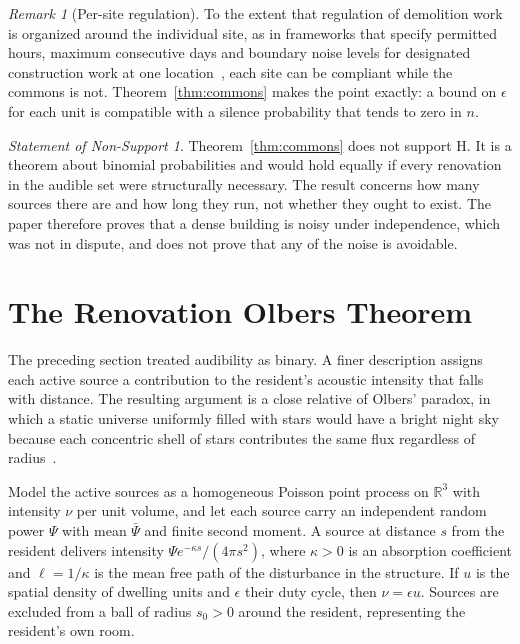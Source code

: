 \documentclass[11pt]{article}
\theoremstyle{definition}
\theoremstyle{remark}
\newtheorem{remark}[theorem]{Remark}
\newtheorem{nonsupport}{Statement of Non-Support}
\newcommand{\R}{\mathbb{R}}
\begin{document}
\begin{remark}[Per-site regulation]
To the extent that regulation of demolition work is organized around the individual site, as in frameworks that specify permitted hours, maximum consecutive days and boundary noise levels for designated construction work at one location~\cite{japanlaw,chinalaw}, each site can be compliant while the commons is not. Theorem~\ref{thm:commons} makes the point exactly: a bound on $\epsilon$ for each unit is compatible with a silence probability that tends to zero in $n$.
\end{remark}

\begin{nonsupport}\label{ns:commons}
Theorem~\ref{thm:commons} does not support H. It is a theorem about binomial probabilities and would hold equally if every renovation in the audible set were structurally necessary. The result concerns how many sources there are and how long they run, not whether they ought to exist. The paper therefore proves that a dense building is noisy under independence, which was not in dispute, and does not prove that any of the noise is avoidable.
\end{nonsupport}

\section{The Renovation Olbers Theorem}\label{sec:olbers}

The preceding section treated audibility as binary. A finer description assigns each active source a contribution to the resident's acoustic intensity that falls with distance. The resulting argument is a close relative of Olbers' paradox, in which a static universe uniformly filled with stars would have a bright night sky because each concentric shell of stars contributes the same flux regardless of radius~\cite{harrison}.

Model the active sources as a homogeneous Poisson point process on $\R^3$ with intensity $\nu$ per unit volume, and let each source carry an independent random power $\Psi$ with mean $\bar\Psi$ and finite second moment. A source at distance $s$ from the resident delivers intensity $\Psi e^{-\kappa s}/(4\pi s^2)$, where $\kappa>0$ is an absorption coefficient and $\ell = 1/\kappa$ is the mean free path of the disturbance in the structure. If $u$ is the spatial density of dwelling units and $\epsilon$ their duty cycle, then $\nu = \epsilon u$. Sources are excluded from a ball of radius $s_0>0$ around the resident, representing the resident's own room.
\end{document}
